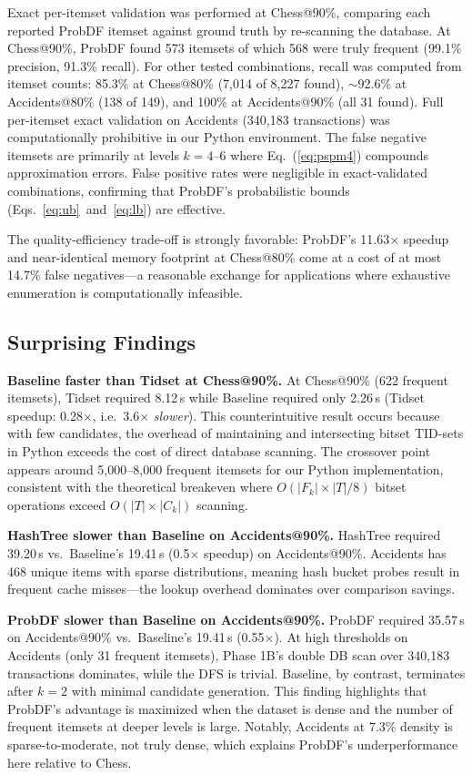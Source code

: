 \documentclass[conference]{IEEEtran}
\begin{document}
Exact per-itemset validation was performed at Chess@90\%, comparing each
reported ProbDF itemset against ground truth by re-scanning the database.
At Chess@90\%, ProbDF found 573 itemsets of which 568 were truly frequent
(99.1\% precision, 91.3\% recall). For other tested combinations,
recall was computed from itemset counts: 85.3\% at Chess@80\% (7,014 of
8,227 found), $\sim$92.6\% at Accidents@80\% (138 of 149), and 100\% at
Accidents@90\% (all 31 found). Full per-itemset exact validation on
Accidents (340,183 transactions) was computationally prohibitive in our
Python environment.
The false negative itemsets are primarily at levels $k = 4$--$6$ where
Eq.~(\ref{eq:pspm4}) compounds approximation errors. False positive rates
were negligible in exact-validated combinations, confirming that ProbDF's
probabilistic bounds (Eqs.~\ref{eq:ub}~and~\ref{eq:lb}) are effective.

The quality-efficiency trade-off is strongly favorable: ProbDF's
11.63$\times$ speedup and near-identical memory footprint at Chess@80\%
come at a cost of at most 14.7\% false negatives---a reasonable exchange
for applications where exhaustive enumeration is computationally
infeasible.

\subsection{Surprising Findings}

\textbf{Baseline faster than Tidset at Chess@90\%.}
At Chess@90\% (622 frequent itemsets), Tidset required 8.12\,s while
Baseline required only 2.26\,s (Tidset speedup: 0.28$\times$, i.e.\
3.6$\times$ \emph{slower}). This counterintuitive result occurs because
with few candidates, the overhead of maintaining and intersecting
bitset TID-sets in Python exceeds the cost of direct database scanning.
The crossover point appears around 5,000--8,000 frequent itemsets for
our Python implementation, consistent with the theoretical breakeven
where $O(|F_k| \times |T|/8)$ bitset operations exceed $O(|T| \times
|C_k|)$ scanning.

\textbf{HashTree slower than Baseline on Accidents@90\%.}
HashTree required 39.20\,s vs.\ Baseline's 19.41\,s (0.5$\times$
speedup) on Accidents@90\%. Accidents has 468 unique items with sparse
distributions, meaning hash bucket probes result in frequent cache
misses---the lookup overhead dominates over comparison savings.

\textbf{ProbDF slower than Baseline on Accidents@90\%.}
ProbDF required 35.57\,s on Accidents@90\% vs.\ Baseline's 19.41\,s
(0.55$\times$). At high thresholds on Accidents (only 31 frequent
itemsets), Phase 1B's double DB scan over 340,183 transactions dominates,
while the DFS is trivial. Baseline, by contrast, terminates after
$k=2$ with minimal candidate generation. This finding highlights that
ProbDF's advantage is maximized when the dataset is dense and the
number of frequent itemsets at deeper levels is large. Notably,
Accidents at 7.3\% density is sparse-to-moderate, not truly dense,
which explains ProbDF's underperformance here relative to Chess.
\end{document}

